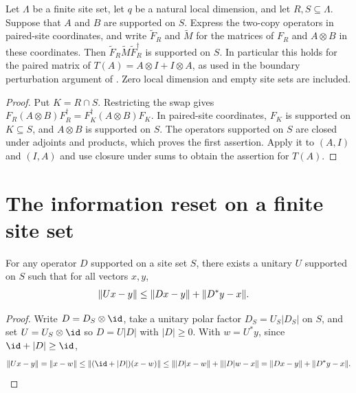 \begin{lemma}
    \label{thm:peps_sheet_swap_conjugate_support}
    \leanok
    Let $\Lambda$ be a finite site set, let $q$ be a natural local dimension,
    and let $R,S\subseteq\Lambda$. Suppose that $A$ and $B$ are supported
    on $S$. Express the two-copy operators in paired-site coordinates,
    and write $\widetilde F_R$ and $\widetilde M$ for the matrices of
    $F_R$ and $A\otimes B$ in these coordinates. Then
    $\widetilde F_R\widetilde M\widetilde F_R^\dagger$ is supported on $S$.
    In particular this holds for the paired matrix of
    $T(A)=A\otimes I+I\otimes A$, as used in the boundary perturbation
    argument of \cite{OpenAI2026PolynomialPEPS}. Zero local dimension
    and empty site sets are included.
\end{lemma}
\begin{proof}
    \leanok
    Put $K=R\cap S$. Restricting the swap gives
    $F_R(A\otimes B)F_R^\dagger=F_K^\dagger(A\otimes B)F_K$.
    In paired-site coordinates, $F_K$ is supported on $K\subseteq S$,
    and $A\otimes B$ is supported on $S$. The operators supported on
    $S$ are closed under adjoints and products, which proves the first
    assertion. Apply it to $(A,I)$ and $(I,A)$ and use closure under
    sums to obtain the assertion for $T(A)$.
\end{proof}

\section{The information reset on a finite site set}

\begin{lemma}
    \label{thm:peps_supported_polar_unitary}
    \leanok
    For any operator $D$ supported on a site set $S$, there exists a unitary $U$ supported on $S$ such that for all vectors $x,y$,
    \begin{align}
        \|Ux-y\| & \le\|Dx-y\|+\|D^*y-x\|. \notag
    \end{align}
\end{lemma}
\begin{proof}
    \leanok
    Write $D=D_S\otimes\id$, take a unitary polar factor $D_S=U_S|D_S|$ on $S$, and set $U=U_S\otimes\id$ so $D=U|D|$ with $|D|\ge0$. With $w=U^*y$, since $\id+|D|\ge\id$,
    \begin{align}
        \|Ux-y\| = \|x-w\| \le \|(\id+|D|)(x-w)\| \le \||D|x-w\|+\||D|w-x\| = \|Dx-y\|+\|D^*y-x\|. \notag
    \end{align}
\end{proof}

